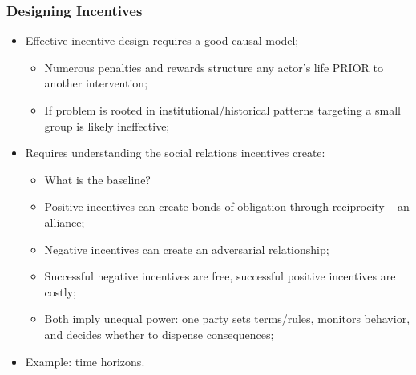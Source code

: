 \documentclass[aspectratio=169]{beamer}
\theoremstyle{principle}
\begin{document}
\begin{frame}
\frametitle{Designing Incentives}

\begin{itemize}
\item Effective incentive design requires a good causal model;
\begin{itemize}
\item Numerous penalties and rewards structure any actor's life PRIOR to another intervention;
\item If problem is rooted in institutional/historical patterns targeting a small group is likely ineffective;
\end{itemize}
\bigskip
\item Requires understanding the social relations incentives create:
\begin{itemize}
\item What is the baseline?
\item Positive incentives can create bonds of obligation through reciprocity -- an alliance;
\item Negative incentives can create an adversarial relationship;
\item Successful negative incentives are free, successful positive incentives are costly;
\item Both imply unequal power: one party sets terms/rules, monitors behavior, and decides whether to dispense consequences;
\end{itemize}
\bigskip
\item Example: time horizons.
\end{itemize}

\end{frame}
\end{document}
